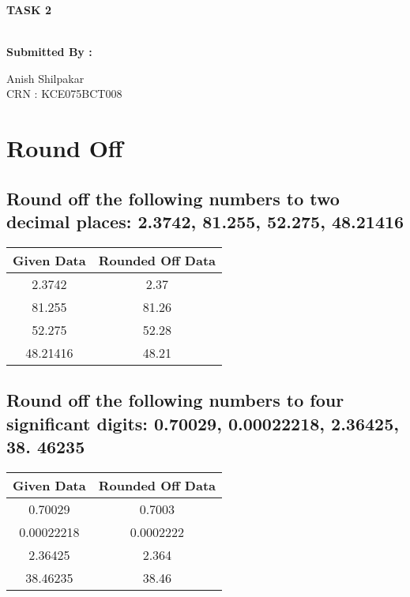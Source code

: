 \documentclass[12pt]{article}
\begin{document}
\begin{center}
\begin{Large}
\textbf{TASK 2}\\\
\end{Large}
\begin{large}
\textbf{Submitted By :}\\
\end{large}
Anish Shilpakar\\
CRN : KCE075BCT008\\
\end{center}

\section{Round Off}
\subsection{Round off the following numbers to two decimal places: 2.3742, 81.255, 52.275, 48.21416}
\bigskip
\begin{center}
\begin{tabular}{|c|c|}
\hline 
Given Data & Rounded Off Data \\ 
\hline 
2.3742 & 2.37 \\ 
\hline 
81.255 & 81.26 \\ 
\hline 
52.275 & 52.28 \\ 
\hline 
48.21416 & 48.21 \\ 
\hline 
\end{tabular} 
\end{center}
\vspace{0.5in}
\subsection{Round off the following numbers to four significant digits: 0.70029, 0.00022218, 2.36425, 38. 46235}
\bigskip
\begin{center}
\begin{tabular}{|c|c|}
\hline 
Given Data & Rounded Off Data \\ 
\hline 
0.70029 & 0.7003 \\ 
\hline 
0.00022218 & 0.0002222 \\ 
\hline 
2.36425 & 2.364 \\ 
\hline 
38.46235 & 38.46 \\ 
\hline 
\end{tabular} 
\end{center}
\vspace{0.5in}
\end{document}
